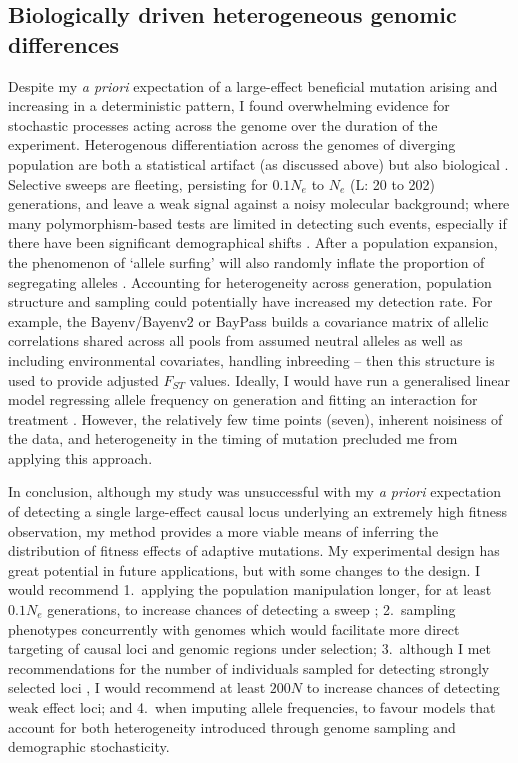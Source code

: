 \subsection{Biologically driven heterogeneous genomic differences}
Despite my \textit{a priori} expectation of a large-effect beneficial mutation arising and increasing in a deterministic pattern, I found overwhelming evidence for stochastic processes acting across the genome over the duration of the experiment. Heterogenous differentiation across the genomes of diverging population are both a statistical artifact (as discussed above) but also biological \citep{Seme19}. Selective sweeps are fleeting, persisting for $0.1N_e$ to $N_e$ (L: 20 to 202) generations, and leave a weak signal against a noisy molecular background; where many polymorphism-based tests are limited in detecting such events, especially if there have been significant demographical shifts \citep{Wals18}. After a population expansion, the phenomenon of ‘allele surfing’ will also randomly inflate the proportion of segregating alleles \citep{Wals18}. Accounting for heterogeneity across generation, population structure and sampling could potentially have increased my detection rate. For example, the Bayenv/Bayenv2 \citep{Coop10, Gunt13} or BayPass \citep{Gaut15} builds a covariance matrix of allelic correlations shared across all pools from assumed neutral alleles as well as including environmental covariates, handling inbreeding – then this structure is used to provide adjusted $F_{ST}$ values. Ideally, I would have run a generalised linear model regressing allele frequency on generation and fitting an interaction for treatment \citep{Vlac19}. However, the relatively few time points (seven), inherent noisiness of the data, and heterogeneity in the timing of mutation precluded me from applying this approach. \par

In conclusion, although my study was unsuccessful with my \textit{a priori} expectation of detecting a single large-effect causal locus underlying an extremely high fitness observation, my method provides a more viable means of inferring the distribution of fitness effects of adaptive mutations. My experimental design has great potential in future applications, but with some changes to the design. I would recommend 1.~applying the population manipulation longer, for at least $0.1N_e$ generations, to increase chances of detecting a sweep \citep{Wals18}; 2.~sampling phenotypes concurrently with genomes which would facilitate more direct targeting of causal loci and genomic regions under selection; 3.~although I met recommendations for the number of individuals sampled for detecting strongly selected loci \citep[$50N$][]{Schl15}, I would recommend at least $200N$ to increase chances of detecting weak effect loci; and 4.~when imputing allele frequencies, to favour models that account for both heterogeneity introduced through genome sampling and demographic stochasticity. \par


